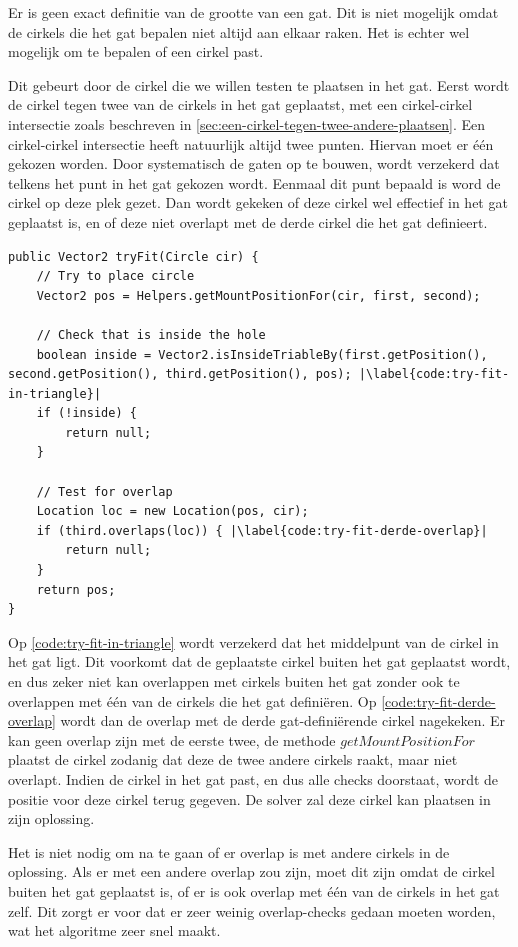 \documentclass[12pt,a4paper,oneside]{book}
\begin{document}
Er is geen exact definitie van de grootte van een gat.
Dit is niet mogelijk omdat de cirkels die het gat bepalen niet altijd aan elkaar raken.
Het is echter wel mogelijk om te bepalen of een cirkel past.

Dit gebeurt door de cirkel die we willen testen te plaatsen in het gat.
Eerst wordt de cirkel tegen twee van de cirkels in het gat geplaatst, met een cirkel-cirkel intersectie zoals beschreven in \autoref{sec:een-cirkel-tegen-twee-andere-plaatsen}.
Een cirkel-cirkel intersectie heeft natuurlijk altijd twee punten.
Hiervan moet er één gekozen worden.
Door systematisch de gaten op te bouwen, wordt verzekerd dat telkens het punt in het gat gekozen wordt.
Eenmaal dit punt bepaald is word de cirkel op deze plek gezet.
Dan wordt gekeken of deze cirkel wel effectief in het gat geplaatst is, en of deze niet overlapt met de derde cirkel die het gat definieert.

\begin{lstlisting}
public Vector2 tryFit(Circle cir) {
	// Try to place circle
	Vector2 pos = Helpers.getMountPositionFor(cir, first, second);

	// Check that is inside the hole
	boolean inside = Vector2.isInsideTriableBy(first.getPosition(), second.getPosition(), third.getPosition(), pos); |\label{code:try-fit-in-triangle}|
	if (!inside) {
		return null;
	}

	// Test for overlap
	Location loc = new Location(pos, cir);
	if (third.overlaps(loc)) { |\label{code:try-fit-derde-overlap}|
		return null;
	}
	return pos;
}
\end{lstlisting}

Op \autoref{code:try-fit-in-triangle} wordt verzekerd dat het middelpunt van de cirkel in het gat ligt.
Dit voorkomt dat de geplaatste cirkel buiten het gat geplaatst wordt, en dus zeker niet kan overlappen met cirkels buiten het gat zonder ook te overlappen met één van de cirkels die het gat definiëren.
Op \autoref{code:try-fit-derde-overlap} wordt dan de overlap met de derde gat-definiërende cirkel nagekeken.
Er kan geen overlap zijn met de eerste twee, de methode $getMountPositionFor$ plaatst de cirkel zodanig dat deze de twee andere cirkels raakt, maar niet overlapt.
Indien de cirkel in het gat past, en dus alle checks doorstaat, wordt de positie voor deze cirkel terug gegeven.
De solver zal deze cirkel kan plaatsen in zijn oplossing.

Het is niet nodig om na te gaan of er overlap is met andere cirkels in de oplossing.
Als er met een andere overlap zou zijn, moet dit zijn omdat de cirkel buiten het gat geplaatst is, of er is ook overlap met één van de cirkels in het gat zelf.
Dit zorgt er voor dat er zeer weinig overlap-checks gedaan moeten worden, wat het algoritme zeer snel maakt.
\end{document}
